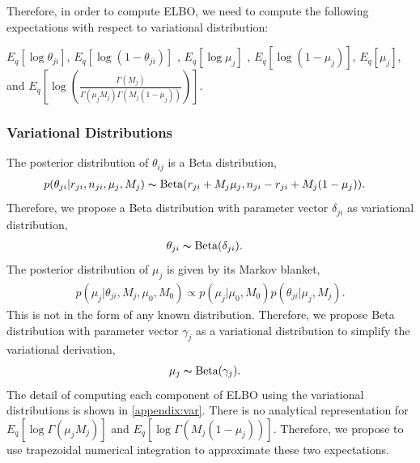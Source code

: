 \documentclass[11pt,reqno]{amsart}
\begin{document}
Therefore, in order to compute ELBO, we need to compute the following expectations with respect to variational distribution:

$ E_q \left[ \log \theta_{ji} \right] $, $ E_q\left[ \log \left( 1 - \theta_{ji}\right) \right] $ , $ E_q  \left[ \log \mu_j \right] $ , $ E_q  \left[ \log (1 - \mu_j)\right] $, $ E_q \left[ \mu_j \right] $, and $ E_q\left[ \log \left( \frac{ \Gamma(M_j) } { \Gamma(\mu_j M_j) \Gamma(M_j (1-\mu_j)) }\right)\right] $.

\subsubsection{Variational Distributions}
The posterior distribution of $\theta_{ij}$ is a Beta distribution,
\begin{align}
&p(\theta_{ji}|r_{ji},n_{ji},\mu_j,M_j)
\thicksim \text{Beta}(r_{ji}+M_j \mu_j, n_{ji}-r_{ji}+M_j(1-\mu_j)).
\end{align}
Therefore, we propose a Beta distribution with parameter vector $\delta_{ji}$ as variational distribution,
\begin{align}
\theta_{ji} &\thicksim \text{Beta}(\delta_{ji}) \nonumber.
\end{align}
%
The posterior distribution of $\mu_j$ is given by its Markov blanket,
\begin{align}
p(\mu_j|\theta_{ji},M_j,\mu_0,M_0)\propto p(\mu_j|\mu_0,M_0)p(\theta_{ji}|\mu_j,M_j).
\end{align}
This is not in the form of any known distribution.
Therefore, we propose Beta distribution with parameter vector $\gamma_{j}$ as a variational distribution to simplify the variational derivation,
\begin{align}
\mu_j &\thicksim \text{Beta}(\gamma_j) \nonumber.
\end{align}
The detail of computing each component of ELBO using the variational distributions is shown in \ref{appendix:var}.
There is no analytical representation for $  E_q  \left[ \log \Gamma(\mu_j M_j) \right] $ and $ E_q  \left[ \log \Gamma(M_j (1-\mu_j)) \right] $.
Therefore, we propose to use trapezoidal numerical integration to approximate these two expectations.
\end{document}
